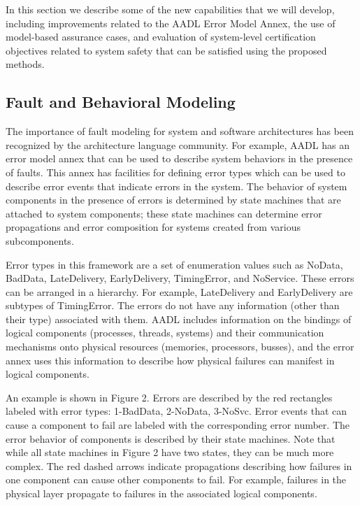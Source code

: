 In this section we describe some of the new capabilities that we will develop, including improvements related to the AADL Error Model Annex, the use of model-based assurance cases, and evaluation of system-level certification objectives related to system safety that can be satisfied using the proposed methods.

\subsection{Fault and Behavioral Modeling}

The importance of fault modeling for system and software architectures has been recognized by the architecture language community. For example, AADL has an error model annex \cite{SAEAS} that can be used to describe system behaviors in the presence of faults. This annex has facilities for defining error types which can be used to describe error events that indicate errors in the system. The behavior of system components in the presence of errors is determined by state machines that are attached to system components; these state machines can determine error propagations and error composition for systems created from various subcomponents.

Error types in this framework are a set of enumeration values such as NoData, BadData, LateDelivery, EarlyDelivery, TimingError, and NoService. These errors can be arranged in a hierarchy. For example, LateDelivery and EarlyDelivery are subtypes of TimingError. The errors do not have any information (other than their type) associated with them. AADL includes information on the bindings of logical components (processes, threads, systems) and their communication mechanisms onto physical resources (memories, processors, busses), and the error annex uses this information to describe how physical failures can manifest in logical components.

An example is shown in Figure 2. Errors are described by the red rectangles labeled with error types: 1-BadData, 2-NoData, 3-NoSvc. Error events that can cause a component to fail are labeled with the corresponding error number. The error behavior of components is described by their state machines. Note that while all state machines in Figure 2 have two states, they can be much more complex. The red dashed arrows indicate propagations describing how failures in one component can cause other components to fail. For example, failures in the physical layer propagate to failures in the associated logical components.

